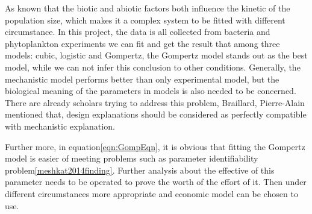 \documentclass[11pt, a4paper]{article}
\begin{document}
As known that the biotic and abiotic factors \citep{loreau1998biodiversity} both influence the kinetic of the population size, which makes it a complex system to be fitted with different circumstance. In this project, the data is all collected from bacteria and phytoplankton experiments we can fit and get the result that among three models: cubic, logistic and Gompertz, the Gompertz model stands out as the best model, while we can not infer this conclusion to other conditions. Generally, the mechanistic model performs better than only experimental model, but the biological meaning of the parameters in models is also needed to be concerned. There are already scholars trying to address this problem, Braillard, Pierre-Alain\citep{braillard2010systems} mentioned that, design explanations should be considered as perfectly compatible with mechanistic explanation.

Further more, in equation\ref{eqn:GompEqn}, it is obvious that fitting the Gompertz model is easier of meeting problems such as parameter identifiability problem\ref{meshkat2014finding}. Further analysis about the effective of this parameter needs to be operated to prove the worth of the effort of it. Then under different circumstances more appropriate and economic model can be chosen to use.


 
  


\end{document}
